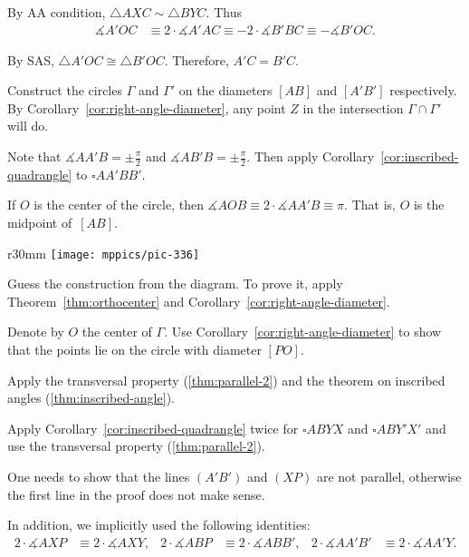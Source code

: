 By AA condition, $\triangle A X C\sim \triangle B Y C$.
Thus 
\begin{align*}
\measuredangle A'OC
&\equiv 
2\cdot \measuredangle A' A C
\equiv-2\cdot\measuredangle B' B C
\equiv-\measuredangle B'OC.
\end{align*}

By SAS, $\triangle A'OC\cong\triangle B'OC$.
Therefore, $A'C=B'C$.

Construct the circles $\Gamma$ and $\Gamma'$
on the diameters $[AB]$ and $[A'B']$ respectively.
By Corollary~\ref{cor:right-angle-diameter},
any point $Z$ in the intersection $\Gamma\cap \Gamma'$ will do.


Note that $\measuredangle AA'B=\pm\tfrac\pi2$ and $\measuredangle AB'B=\pm\tfrac\pi2$.
Then apply Corollary~\ref{cor:inscribed-quadrangle}
to $\square AA'BB'$.

If $O$ is the center of the circle, then 
$\measuredangle AOB\equiv 2\cdot \measuredangle AA'B\equiv\pi$.
That is, $O$ is the midpoint of~$[AB]$.

\begin{wrapfigure}{r}{30mm}
\vskip-2mm
\centering
\texttt{[image: mppics/pic-336]}
\end{wrapfigure}

Guess the construction from the diagram.
To prove it,
apply Theorem~\ref{thm:orthocenter} and Corollary~\ref{cor:right-angle-diameter}.

Denote by $O$ the center of $\Gamma$.
Use Corollary~\ref{cor:right-angle-diameter} to show that the points lie on the circle with diameter $[PO]$.

 Apply the transversal property (\ref{thm:parallel-2}) and the theorem on inscribed angles (\ref{thm:inscribed-angle}).

Apply Corollary~\ref{cor:inscribed-quadrangle} twice for $\square ABYX$ and $\square ABY'X'$ and use the transversal property (\ref{thm:parallel-2}).


One needs to show that the lines $(A'B')$ and $(XP)$ are not parallel, otherwise the first line in the proof does not make sense.



In addition, we implicitly used the following identities:
\begin{align*}
2\cdot \measuredangle AXP&\equiv2\cdot \measuredangle AXY,
&
2\cdot \measuredangle ABP&\equiv2\cdot \measuredangle ABB',
&
2\cdot \measuredangle AA'B'&\equiv2\cdot \measuredangle AA'Y.
\end{align*}

